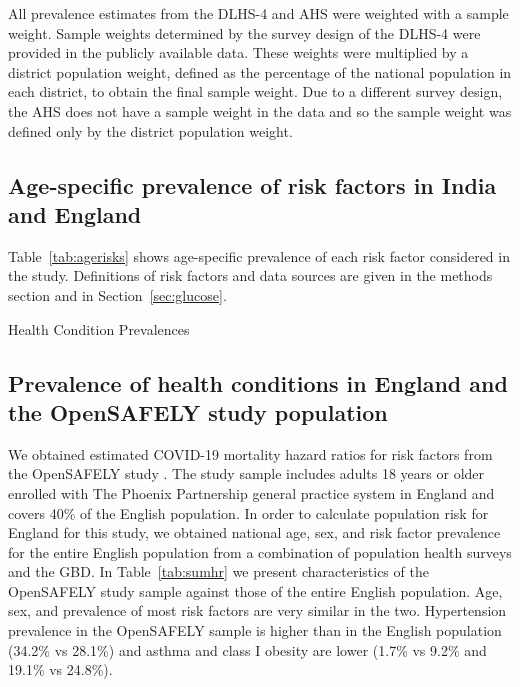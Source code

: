 \documentclass[10pt,letterpaper]{article}
\numberwithin{equation}{section}
\begin{document}
All prevalence estimates from the DLHS-4 and AHS were weighted with a sample weight. Sample weights determined by the survey design of the DLHS-4 were provided in the publicly available data. These weights were multiplied by a district population weight, defined as the percentage of the national population in each district, to obtain the final sample weight. Due to a different survey design, the AHS does not have a sample weight in the data and so the sample weight was defined only by the district population weight.

\subsection{Age-specific prevalence of risk factors in India and England}

Table~\ref{tab:agerisks} shows age-specific prevalence of each risk factor considered in the study. Definitions of risk factors and data sources are given in the methods section and in Section~\ref{sec:glucose}.

\begin{landscape}
  \begin{table}[H]
    \begin{center}
      \caption{Health Condition Prevalences}
      \label{tab:agerisks}
      
      
    \end{center}
  \end{table}
\end{landscape}

\clearpage
\subsection{Prevalence of health conditions in England and the OpenSAFELY study population}
We obtained estimated COVID-19 mortality hazard ratios for risk factors from the OpenSAFELY study \cite{williamson_opensafely_2020}. The study sample includes adults 18 years or older enrolled with The Phoenix Partnership general practice system in England and covers 40\% of the English population. In order to calculate population risk for England for this study, we obtained national age, sex, and risk factor prevalence for the entire English population from a combination of population health surveys and the GBD. In Table~\ref{tab:sumhr} we present characteristics of the OpenSAFELY study sample against those of the entire English population. Age, sex, and prevalence of most risk factors are very similar in the two. Hypertension prevalence in the OpenSAFELY sample is higher than in the English population (34.2\% vs 28.1\%) and asthma and class I obesity are lower (1.7\% vs 9.2\% and 19.1\% vs 24.8\%).
\end{document}
